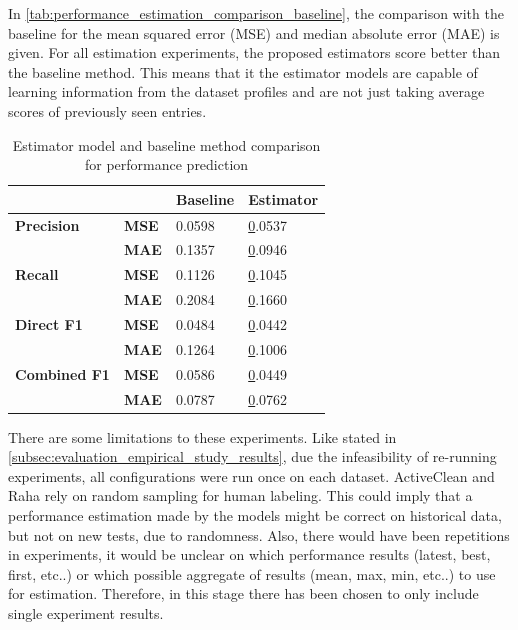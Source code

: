 In \autoref{tab:performance_estimation_comparison_baseline}, the comparison with the baseline for the mean squared error (MSE) and median absolute error (MAE) is given. For all estimation experiments, the proposed estimators score better than the baseline method. This means that it the estimator models are capable of learning information from the dataset profiles and are not just taking average scores of previously seen entries.

\begin{table}[h]
\centering
\begin{tabular}{ll|l|l}
                     &              & \textbf{Baseline} & \textbf{Estimator} \\ \hline
\textbf{Precision}   & \textbf{MSE} & 0.0598            & {\ul 0.0537}       \\ \hline
\textbf{}            & \textbf{MAE} & 0.1357            & {\ul 0.0946}       \\ \hline
\textbf{Recall}      & \textbf{MSE} & 0.1126            & {\ul 0.1045}       \\ \hline
\textbf{}            & \textbf{MAE} & 0.2084            & {\ul 0.1660}       \\ \hline
\textbf{Direct F1}   & \textbf{MSE} & 0.0484            & {\ul 0.0442}       \\ \hline
\textbf{}            & \textbf{MAE} & 0.1264            & {\ul 0.1006}       \\ \hline
\textbf{Combined F1} & \textbf{MSE} & 0.0586            & {\ul 0.0449}       \\ \hline
\textbf{}            & \textbf{MAE} & 0.0787            & {\ul 0.0762}      
\end{tabular}
\caption{Estimator model and baseline method comparison for performance prediction}
\label{tab:performance_estimation_comparison_baseline}
\end{table}

There are some limitations to these experiments. Like stated in \autoref{subsec:evaluation_empirical_study_results}, due the infeasibility of re-running experiments, all configurations were run once on each dataset. ActiveClean and Raha rely on random sampling for human labeling. This could imply that a performance estimation made by the models might be correct on historical data, but not on new tests, due to randomness. Also, there would have been repetitions in experiments, it would be unclear on which performance results (latest, best, first, etc..) or which possible aggregate of results (mean, max, min, etc..) to use for estimation. Therefore, in this stage there has been chosen to only include single experiment results.

